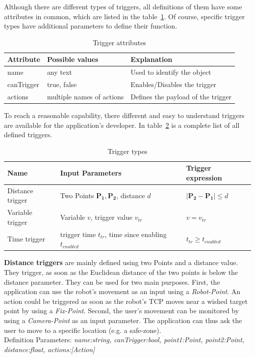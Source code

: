 Although there are different types of triggers, all definitions of them have some attributes in common, which are listed in the table~\ref{Table:TriggerAttributes}. Of course, specific trigger types have additional parameters to define their function.

 \begin{table}[!h]
 	\caption{Trigger attributes}
 	\label{Table:TriggerAttributes}
 	\centering
 	\begin{tabular}{lll}
 		\toprule
 		Attribute & Possible values		& Explanation	\\		
 		\midrule
 		name & any text & Used to identify the object \\
 		canTrigger & true, false		& Enables/Disables the trigger \\
 		actions & multiple names of actions & Defines the payload of the trigger \\
 		\bottomrule
 	\end{tabular}
 \end{table}

To reach a reasonable capability, there different and easy to understand triggers are available for the application's developer. In table~\ref{Table:Triggers} is a complete list of all defined triggers.

 
 \begin{table}
 	\caption{Trigger types}
 	\label{Table:Triggers}
 	\centering
 	\begin{tabular}{lll}
 		\toprule
 		Name & Input Parameters		& Trigger expression	\\		
 		\midrule
 		Distance trigger & Two Points $\boldsymbol{P_1}, \boldsymbol{P_2}$, distance $d$		&  $|\boldsymbol{P_2}-\boldsymbol{P_1}| \le d$ \\
		Variable trigger & Variable $v$, trigger value $v_{tr}$ 		& $v = v_{tr}$	 \\
		Time trigger & trigger time $t_{tr}$, time since enabling $t_{enabled}$ & $t_{tr} \geq t_{enabled}$\\
		\bottomrule
	\end{tabular}
\end{table}

\textbf{Distance triggers} are mainly defined using two Points and a distance value. They trigger, as soon as the Euclidean distance of the two points is below the distance parameter. They can be used for two main purposes. First, the application can use the robot's movement as an input using a \textit{Robot-Point}. An action could be triggered as soon as the robot's TCP moves near a wished target point by using a \textit{Fix-Point}. Second, the user's movement can be monitored by using a \textit{Camera-Point} as an input parameter. The application can thus ask the user to move to a specific location (e.g. a safe-zone).\\Definition Parameters: \textit{name:string, canTrigger:bool, point1:Point, point2:Point, distance:float, actions:[Action] }

